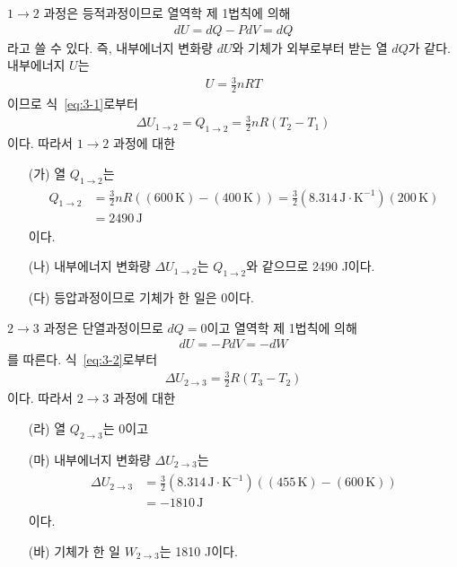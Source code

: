 \documentclass[floatfix,nofootinbib,superscriptaddress,fleqn]{revtex4}
\begin{document}
$1\to 2$ 과정은 등적과정이므로 열역학 제 1법칙에 의해
\begin{align}\label{eq:3-1}
  dU = dQ -PdV = dQ
\end{align}
라고 쓸 수 있다. 즉, 내부에너지 변화량 $dU$와 기체가 외부로부터 받는 열 $dQ$가 같다.
내부에너지 $U$는
\begin{align}\label{eq:3-2}
  U=\frac{3}{2}nRT
\end{align}
이므로 식~\eqref{eq:3-1}로부터
\begin{align}
  \Delta U_{1\to 2} = Q_{1\to 2} = \frac{3}{2}nR(T_2-T_1)
\end{align}
이다. 따라서 $1\to 2$ 과정에 대한
\begin{itemize}
  \item[(가)] 열 $Q_{1\to 2}$는
  \begin{align}
    \begin{split}
      Q_{1\to 2} &= \frac{3}{2}nR\left((600\,\mathrm{K})-(400\,\mathrm{K})\right)
      = \frac{3}{2}(8.314\,\mathrm{J\cdot K^{-1}})(200\,\mathrm{K}) \\
      &= 2490\,\mathrm{J}
    \end{split}
  \end{align}
  이다.
  \item[(나)] 
  내부에너지 변화량 $\Delta U _{1\to 2}$는 $Q_{1\to 2}$와 같으므로 2490 J이다.
  \item[(다)] 
  등압과정이므로 기체가 한 일은 0이다.
\end{itemize}
$2\to 3$ 과정은 단열과정이므로 $dQ=0$이고 열역학 제 1법칙에 의해
\begin{align}
  dU = -PdV = -dW
\end{align}
를 따른다. 식~\eqref{eq:3-2}로부터
\begin{align}
  \Delta U_{2\to 3} = \frac{3}{2}R(T_3-T_2)
\end{align}
이다. 따라서 $2\to 3$ 과정에 대한
  \begin{itemize}
  \item[(라)] 열 $Q_{2\to 3}$는 0이고
  \item[(마)] 내부에너지 변화량 $\Delta U_{2\to 3}$는
  \begin{align}
    \begin{split}
      \Delta U_{2\to 3} &= \frac{3}{2}(8.314\,\mathrm{J\cdot K^{-1}})
      ((455\,\mathrm{K})-(600\,\mathrm{K})) \\
      &= -1810\,\mathrm{J}
    \end{split}
  \end{align}
  이다.
  \item[(바)]
  기체가 한 일 $W_{2\to 3}$는 1810 J이다.
\end{itemize}
\end{document}
